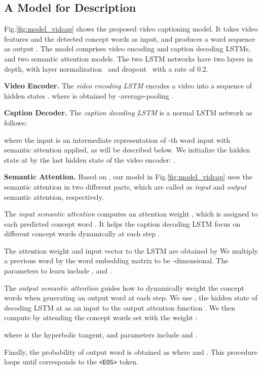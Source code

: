 \documentclass[10pt,twocolumn,letterpaper]{article}
\theoremstyle{nonumberplain}
\begin{document}
\subsection{A Model for Description}
\label{subsec:model_description}


Fig.\ref{fig:model_vidcap} shows the proposed video captioning model.
It takes video features  and the detected concept words  as input,
and produces a word sequence as output .
The model comprises video encoding and caption decoding LSTMs, and two semantic attention models.
The two LSTM networks have two layers in depth, with layer normalization~\cite{Jimmy-arxiv-2016} and dropout~\cite{srivastava-jmlr-2014} with a rate of 0.2.


\textbf{Video Encoder.}
The \textit{video encoding LSTM} encodes a video into a sequence of hidden states .
where  is obtained by -average-pooling .

\textbf{Caption Decoder.}
The \textit{caption decoding LSTM} is a normal LSTM network as follows:

where the input  is an intermediate representation of -th word input with semantic attention applied, as will be described below.
We initialize the hidden state at  by the last hidden state of the video encoder: .

\textbf{Semantic Attention.}
Based on \cite{quanzeng-cvpr-2016}, our model in Fig.\ref{fig:model_vidcap} uses the semantic attention in two different parts,
which are called as \textit{input} and \textit{output} semantic attention, respectively.

The \emph{input semantic attention}  computes an attention weight ,
which is assigned to each predicted concept word .
It helps the caption decoding LSTM focus on different concept words dynamically at each step .

The attention weight  and input vector  to the LSTM are obtained by
We multiply a previous word  by the word embedding matrix  to be -dimensional.
The parameters to learn include ,   and .

The \emph{output semantic attention}  guides how to dynamically weight the concept words  when generating an output word  at each step.
We use , the hidden state of decoding LSTM at  as an input to the output attention function .
We then compute  by attending the concept words set  with the weight :

where  is the hyperbolic tangent,
and parameters include 
and .

Finally, the probability of output word is obtained as
where  and .
This procedure loops until  corresponds to the \texttt{<EOS>} token.
\end{document}
